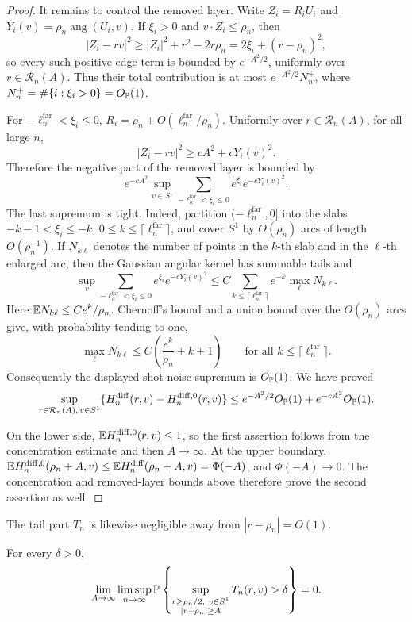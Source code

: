\begin{proof}
It remains to control the removed layer.  Write \(Z_i=R_iU_i\) and
\(Y_i(v)=\rho_n\operatorname{ang}(U_i,v)\).  If \(\xi_i>0\) and \(v\cdot Z_i\le\rho_n\),
then
\[
    |Z_i-rv|^2
    \ge |Z_i|^2+r^2-2r\rho_n
    =2\xi_i+(r-\rho_n)^2,
\]
so every such positive-edge term is bounded by \(e^{-A^2/2}\), uniformly
over \(r\in\mathcal R_n(A)\).  Thus their total contribution is at most
\(e^{-A^2/2}N_n^+\), where \(N_n^+=\#\{i:\xi_i>0\}=O_{\mathbb P}(1)\).

For \(-\ell_n^{\mathrm{far}}<\xi_i\le0\), \(R_i=\rho_n+O(\ell_n^{\mathrm{far}}/\rho_n)\).  Uniformly over
\(r\in\mathcal R_n(A)\), for all large \(n\),
\[
    |Z_i-rv|^2
    \ge cA^2+cY_i(v)^2 .
\]
Therefore the negative part of the removed layer is bounded by
\[
    e^{-cA^2}
    \sup_{v\in S^1}
    \sum_{-\ell_n^{\mathrm{far}}<\xi_i\le0} e^{\xi_i}e^{-cY_i(v)^2}.
\]
The last supremum is tight.  Indeed, partition \((-\ell_n^{\mathrm{far}},0]\) into the slabs
\(-k-1<\xi_i\le-k\), \(0\le k\le\lceil \ell_n^{\mathrm{far}}\rceil\), and cover \(S^1\) by
\(O(\rho_n)\) arcs of length \(O(\rho_n^{-1})\).  If \(N_{k\ell}\) denotes
the number of points in the \(k\)-th slab and in the \(\ell\)-th enlarged
arc, then the Gaussian angular kernel has summable tails and
\[
    \sup_v\sum_{-\ell_n^{\mathrm{far}}<\xi_i\le0} e^{\xi_i}e^{-cY_i(v)^2}
    \le
    C\sum_{k\le\lceil \ell_n^{\mathrm{far}}\rceil} e^{-k}\max_\ell N_{k\ell}.
\]
Here \(\mathbb E N_{k\ell}\le C e^k/\rho_n\).  Chernoff's bound and a union bound
over the \(O(\rho_n)\) arcs give, with probability tending to one,
\[
    \max_\ell N_{k\ell}
    \le C\left(\frac{e^k}{\rho_n}+k+1\right)
    \qquad\text{for all }k\le\lceil \ell_n^{\mathrm{far}}\rceil .
\]
Consequently the displayed shot-noise supremum is \(O_{\mathbb P}(1)\).  We have
proved
\[
    \sup_{r\in\mathcal R_n(A),\,v\in S^1}
    \{H_n^{\mathrm{diff}}(r,v)-H_n^{\mathrm{diff},0}(r,v)\}
    \le e^{-A^2/2}O_{\mathbb P}(1)+e^{-cA^2}O_{\mathbb P}(1).
\]

On the lower side, \(\mathbb E H_n^{\mathrm{diff},0}(r,v)\le1\), so the first
assertion follows
from the concentration estimate and then \(A\to\infty\).  At the upper
boundary,
\(\mathbb E H_n^{\mathrm{diff},0}(\rho_n+A,v)
\le\mathbb E H_n^{\mathrm{diff}}(\rho_n+A,v)=\Phi(-A)\), and
\(\Phi(-A)\to0\). The concentration and removed-layer bounds above therefore
prove the second assertion as well.
\end{proof}

The tail part \(T_n\) is likewise negligible away from
\(|r-\rho_n|=O(1)\).
\begin{lemma}
\label{lem:d-two-tail-outside}
For every \(\delta>0\),
\[
    \lim_{A\to\infty}\limsup_{n\to\infty}
    \mathbb P\left\{
        \sup_{\substack{r\ge\rho_n/2,\ v\in S^1\\ |r-\rho_n|\ge A}}
        T_n(r,v)>\delta
    \right\}=0 .
\]
\end{lemma}

